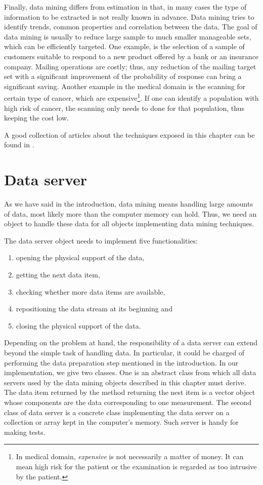 Finally, data mining differs from estimation in that, in many
cases the type of information to be extracted is not really known
in advance. Data mining tries to identify trends, common
properties and correlation between the data. The goal of data
mining is usually to reduce large sample to much smaller
manageable sets, which can be efficiently targeted. One example,
is the selection of a sample of customers suitable to respond to a
new product offered by a bank or an insurance company. Mailing
operations are costly; thus, any reduction of the mailing target
set with a significant improvement of the probability of response
can bring a significant saving. Another example in the medical
domain is the scanning for certain type of cancer, which are
expensive\footnote{In medical domain, \textsl{expensive} is not
necessarily a matter of money. It can mean high risk for the
patient or the examination is regarded as too intrusive by the
patient.}. If one can identify a population with high risk of
cancer, the scanning only needs to done for that population, thus
keeping the cost low.

A good collection of articles about the techniques exposed in this
chapter can be found in \cite{AtchBry}.

\section{Data server}
\label{sec:dataserver}  As we
have said in the introduction, data mining means handling large
amounts of data, most likely more than the computer memory can
hold. Thus, we need an object to handle these data for all objects
implementing data mining techniques.

\noindent The data server object needs to implement five
functionalities:
\begin{enumerate}
  \item opening the physical support of the data,
  \item getting the next data item,
  \item checking whether more data items are available,
  \item repositioning the data stream at its beginning and
  \item closing the physical support of the data.
\end{enumerate}
Depending on the problem at hand, the responsibility of a data
server can extend beyond the simple task of handling data. In
particular, it could be charged of performing the data preparation
step mentioned in the introduction. In our implementation, we give
two classes. One is an abstract class from which all data servers
used by the data mining objects described in this chapter must
derive. The data item returned by the method returning the nest
item is a vector object whose components are the data
corresponding to one measurement. The second class of data server
is a concrete class implementing the data server on a collection
or array kept in the computer's memory. Such server is handy for
making tests.

